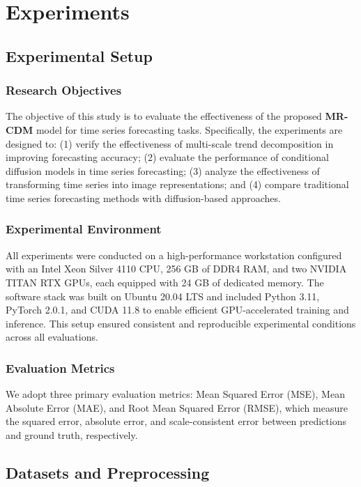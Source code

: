 \section{Experiments}
\label{sec:experiments}

\subsection{Experimental Setup}

\subsubsection{Research Objectives}
The objective of this study is to evaluate the effectiveness of the proposed \textbf{MR-CDM} model for time series forecasting tasks. Specifically, the experiments are designed to:
(1) verify the effectiveness of multi-scale trend decomposition in improving forecasting accuracy;
(2) evaluate the performance of conditional diffusion models in time series forecasting;
(3) analyze the effectiveness of transforming time series into image representations; and
(4) compare traditional time series forecasting methods with diffusion-based approaches.

\subsubsection{Experimental Environment}
All experiments were conducted on a high-performance workstation configured with an Intel Xeon Silver 4110 CPU, 256 GB of DDR4 RAM, and two NVIDIA TITAN RTX GPUs, each equipped with 24 GB of dedicated memory. The software stack was built on Ubuntu 20.04 LTS and included Python 3.11, PyTorch 2.0.1, and CUDA 11.8 to enable efficient GPU-accelerated training and inference. This setup ensured consistent and reproducible experimental conditions across all evaluations.

\subsubsection{Evaluation Metrics}
We adopt three primary evaluation metrics: Mean Squared Error (MSE), Mean Absolute Error (MAE), and Root Mean Squared Error (RMSE), which measure the squared error, absolute error, and scale-consistent error between predictions and ground truth, respectively. 

\subsection{Datasets and Preprocessing}

